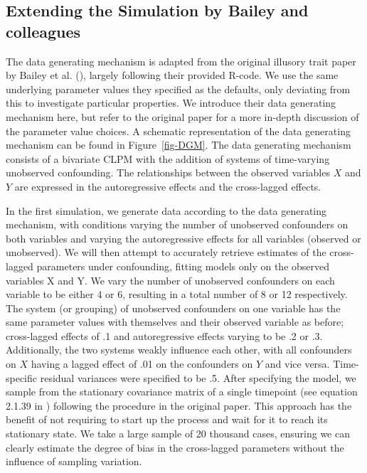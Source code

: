 \documentclass[
  man,
  floatsintext,
  longtable,
  nolmodern,
  notxfonts,
  notimes,
  colorlinks=true,linkcolor=blue,citecolor=blue,urlcolor=blue]{apa7}
\begin{document}
\subsection{Extending the Simulation by Bailey and
colleagues}\label{extending-the-simulation-by-bailey-and-colleagues}

The data generating mechanism is adapted from the original illusory
trait paper by Bailey et al.
(), largely following
their provided R-code. We use the same underlying parameter values they
specified as the defaults, only deviating from this to investigate
particular properties. We introduce their data generating mechanism
here, but refer to the original paper for a more in-depth discussion of
the parameter value choices. A schematic representation of the data
generating mechanism can be found in Figure~\ref{fig-DGM}. The data
generating mechanism consists of a bivariate CLPM with the addition of
systems of time-varying unobserved confounding. The relationships
between the observed variables \(X\) and \(Y\) are expressed in the
autoregressive effects and the cross-lagged effects.

In the first simulation, we generate data according to the data
generating mechanism, with conditions varying the number of unobserved
confounders on both variables and varying the autoregressive effects for
all variables (observed or unobserved). We will then attempt to
accurately retrieve estimates of the cross-lagged parameters under
confounding, fitting models only on the observed variables X and Y. We
vary the number of unobserved confounders on each variable to be either
4 or 6, resulting in a total number of 8 or 12 respectively. The system
(or grouping) of unobserved confounders on one variable has the same
parameter values with themselves and their observed variable as before;
cross-lagged effects of .1 and autoregressive effects varying to be .2
or .3. Additionally, the two systems weakly influence each other, with
all confounders on \(X\) having a lagged effect of .01 on the
confounders on \(Y\) and vice versa. Time-specific residual variances
were specified to be .5. After specifying the model, we sample from the
stationary covariance matrix of a single timepoint (see equation 2.1.39
in ) following the procedure in the original paper. This approach has
the benefit of not requiring to start up the process and wait for it to
reach its stationary state. We take a large sample of 20 thousand cases,
ensuring we can clearly estimate the degree of bias in the cross-lagged
parameters without the influence of sampling variation.
\end{document}
